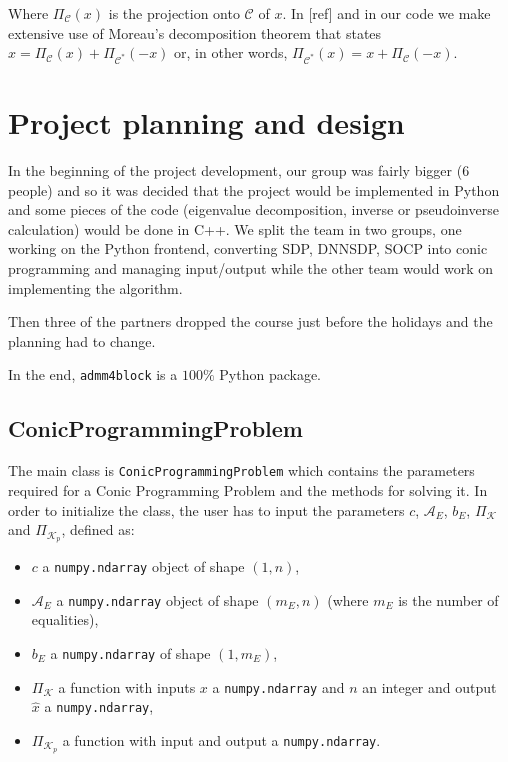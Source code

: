 \documentclass[paper=a4, fontsize=11pt]{scrartcl}
\numberwithin{equation}{section}		%
\numberwithin{figure}{section}			%
\numberwithin{table}{section}				%
\begin{document}
Where $\Pi_\mathcal{C}(x)$ is the projection onto $\mathcal{C}$ of $x$. In [ref] and in our code we make extensive use of Moreau's decomposition theorem that states $x = \Pi_{\mathcal{C}}(x)+ \Pi_{\mathcal{C}^*}(-x)$ or, in other words, $\Pi_{\mathcal{C}^*}(x) = x + \Pi_{\mathcal{C}}(-x)$.

\section{Project planning and design}

In the beginning of the project development, our group was fairly bigger (6 people) and so it was decided that the project would be implemented in Python and some pieces of the code (eigenvalue decomposition, inverse or pseudoinverse calculation) would be done in C++. We split the team in two groups, one working on the Python frontend, converting SDP, DNNSDP, SOCP into conic programming and managing input/output while the other team would work on implementing the algorithm.

Then three of the partners dropped the course just before the holidays and the planning had to change.

In the end, \texttt{admm4block} is a $100\%$ Python package. 

\subsection{ConicProgrammingProblem}

The main class is \texttt{ConicProgrammingProblem} which contains the parameters required for a Conic Programming Problem and the methods for solving it. In order to initialize the class, the user has to input the parameters $c$, $\mathcal{A}_E$, $b_E$, $\Pi_{\mathcal{K}}$ and $\Pi_{\mathcal{K}_p}$, defined as:

\begin{itemize}
\item $c$ a \texttt{numpy.ndarray} object of shape $(1,n)$,
\item $\mathcal{A}_E$ a \texttt{numpy.ndarray} object of shape $(m_E,n)$ (where $m_E$ is the number of equalities),
\item $b_E$ a \texttt{numpy.ndarray} of shape $(1,m_E)$,
\item $\Pi_{\mathcal{K}}$ a function with inputs $x$ a \texttt{numpy.ndarray} and $n$ an integer and output \\$\hat{x}$ a \texttt{numpy.ndarray},
\item $\Pi_{\mathcal{K}_p}$ a function with input and output a \texttt{numpy.ndarray}.
\end{itemize}
\end{document}
